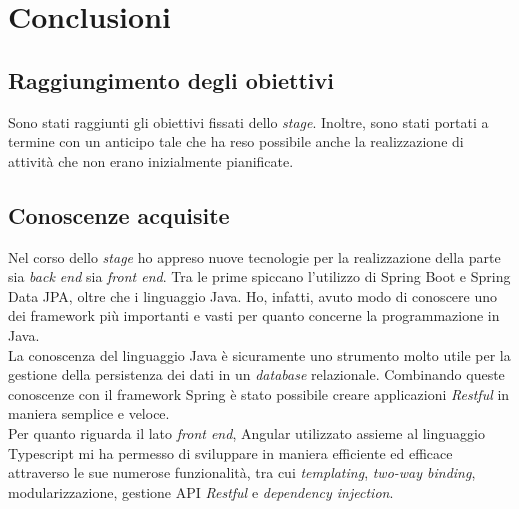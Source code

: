 
\chapter{Conclusioni}
\label{cap:conclusioni}
\section{Raggiungimento degli obiettivi}
Sono stati raggiunti gli obiettivi fissati dello \textit{stage}. Inoltre, sono
stati portati a termine con un anticipo tale che ha reso possibile anche la
realizzazione di attività che non erano inizialmente pianificate.



\section{Conoscenze acquisite}
Nel corso dello \textit{stage} ho appreso nuove tecnologie per la realizzazione
della parte sia \textit{back end} sia \textit{front end}. Tra le prime spiccano
l'utilizzo di Spring Boot e Spring Data JPA, oltre che i linguaggio Java. Ho,
infatti, avuto modo di conoscere uno  dei \gls{framework}  più importanti e
vasti per quanto concerne la programmazione in Java.\\
La conoscenza del linguaggio Java è sicuramente uno strumento molto utile per
la gestione della persistenza dei dati in un \textit{database} relazionale.
Combinando queste conoscenze con il \gls{framework} Spring è stato possibile
creare applicazioni \textit{Restful} in maniera semplice e veloce.\\
Per quanto riguarda il lato \textit{front end}, Angular utilizzato assieme al
linguaggio Typescript mi ha permesso di sviluppare in maniera efficiente ed
efficace attraverso le sue numerose funzionalità, tra cui \textit{templating},
\textit{two-way binding},
modularizzazione, gestione \gls{API} \textit{Restful} e \textit{dependency
    injection}.

